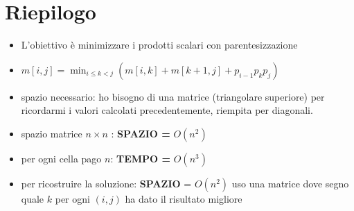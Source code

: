 \section{Riepilogo}

\begin{itemize}
  \item
        L'obiettivo è minimizzare i prodotti scalari con parentesizzazione
  \item
        $m[i,j] = \min_{i \leq k < j} (m[i,k] + m[k+1, j] + p_{i-1} p_k p_j)$
  \item
        spazio necessario: ho bisogno di una matrice (triangolare superiore)
        per ricordarmi i valori calcolati precedentemente, riempita per
        diagonali.
  \item
        spazio matrice $n \times n$ : \textbf{SPAZIO =} $O(n^2)$
  \item
        per ogni cella pago $n$: \textbf{TEMPO =} $O(n^3)$
  \item
        per ricostruire la soluzione: \textbf{SPAZIO} = $O(n^2)$ uso una
        matrice dove segno quale $k$ per ogni $(i,j)$ ha dato il risultato
        migliore
\end{itemize}
